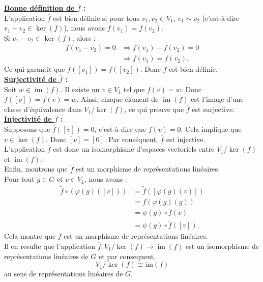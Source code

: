\documentclass[a4paper, 14pt]{report}
\begin{document}
\begin{onehalfspace}
{\textbf{\underline{Bonne définition de \( \overline{f} \)} :}\\
L'application \( \overline{f} \) est bien définie si pour tous \( v_1, v_2 \in V_1 \), \( v_1 \sim v_2 \) (c'est-à-dire \( v_1 - v_2 \in \ker(f) \)), nous avons \( f(v_1) = f(v_2) \).\\
Si \( v_1 - v_2 \in \ker(f) \), alors :
\[
\begin{aligned}
	f(v_1-v_2)=0 & \Rightarrow f(v_1)-f(v_2)=0 \\
	&\Rightarrow f(v_1)=f(v_2).
\end{aligned}
\]
Ce qui garantit que \( \overline{f}([v_1]) = \overline{f}([v_2]) \). Donc \( \overline{f} \) est bien définie.\\

\textbf{\underline{Surjectivité de \( \overline{f} \)} :}\\
Soit \( w \in \operatorname{im}(f) \). Il existe un \( v \in V_1 \) tel que \( f(v) = w \). Donc \( \overline{f}([v]) = f(v) = w \). Ainsi, chaque élément de \( \operatorname{im}(f) \) est l'image d'une classe d'équivalence dans \( V_1 / \ker(f) \), ce qui prouve que \( \overline{f} \) est surjective.\\

\textbf{\underline{Injectivité de \( \overline{f} \)} :}\\
Supposons que \( \overline{f}([v]) = 0 \), c'est-à-dire que \( f(v) = 0 \). Cela implique que \( v \in \ker(f) \). Donc \( [v] = [0] \). Par conséquent, \( \overline{f} \) est injective.\\
L'application \( \overline{f} \) est donc un isomorphisme d'espaces vectoriels entre \( V_1 / \ker(f) \) et \( \operatorname{im}(f) \).\\
Enfin, montrons que $\tilde{f}$ est un morphisme de représentations linéaires. \\
Pour tout $g \in G$ et $v \in V_1$, nous avons :
\[
\begin{aligned}
	\tilde{f} \circ (\varphi(g) ([v])) &= \tilde{f}([\varphi(g) (v)])\\
	&= f(\varphi(g) (g)) \\
	&= \psi(g) \circ f(v) \\
	&= \psi(g) \circ\tilde{f}([v]).
\end{aligned}
\]
Cela montre que \( \overline{f} \) est un morphisme de représentations linéaires.\\
Il en resulte que l'application \( \overline{f} : V_1 / \ker(f) \to \operatorname{im}(f) \) est un isomorphisme de représentations linéaires de \( G \) et par consequent,
\[ V_1 / \ker(f) \cong \mathrm{im}(f) \] 
au sens de représentations linéaires de \(G\).	


}
\end{onehalfspace}
\end{document}
